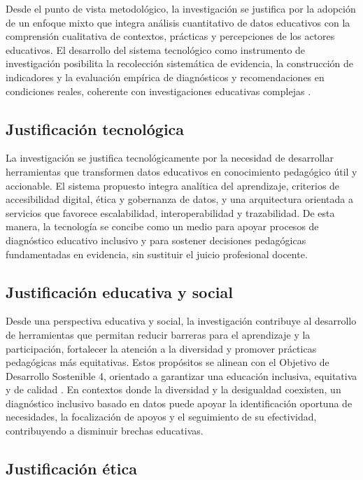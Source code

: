 \begin{refsection}
Desde el punto de vista metodológico, la investigación se justifica por la adopción de un enfoque mixto que integra análisis cuantitativo de datos educativos con la comprensión cualitativa de contextos, prácticas y percepciones de los actores educativos. El desarrollo del sistema tecnológico como instrumento de investigación posibilita la recolección sistemática de evidencia, la construcción de indicadores y la evaluación empírica de diagnósticos y recomendaciones en condiciones reales, coherente con investigaciones educativas complejas \parencite{creswell2018}.

\subsection{Justificación tecnológica}

La investigación se justifica tecnológicamente por la necesidad de desarrollar herramientas que transformen datos educativos en conocimiento pedagógico útil y accionable. El sistema propuesto integra analítica del aprendizaje, criterios de accesibilidad digital, ética y gobernanza de datos, y una arquitectura orientada a servicios que favorece escalabilidad, interoperabilidad y trazabilidad. De esta manera, la tecnología se concibe como un medio para apoyar procesos de diagnóstico educativo inclusivo y para sostener decisiones pedagógicas fundamentadas en evidencia, sin sustituir el juicio profesional docente.

\subsection{Justificación educativa y social}

Desde una perspectiva educativa y social, la investigación contribuye al desarrollo de herramientas que permitan reducir barreras para el aprendizaje y la participación, fortalecer la atención a la diversidad y promover prácticas pedagógicas más equitativas. Estos propósitos se alinean con el Objetivo de Desarrollo Sostenible 4, orientado a garantizar una educación inclusiva, equitativa y de calidad \parencite{onu2015}. En contextos donde la diversidad y la desigualdad coexisten, un diagnóstico inclusivo basado en datos puede apoyar la identificación oportuna de necesidades, la focalización de apoyos y el seguimiento de su efectividad, contribuyendo a disminuir brechas educativas.

\subsection{Justificación ética}


\end{refsection}
